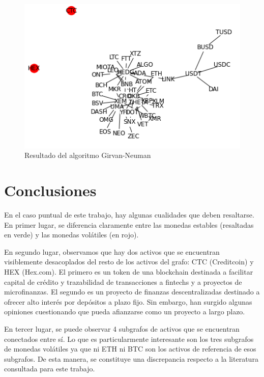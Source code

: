 \documentclass[runningheads,a4paper,10pt]{etc/llncs}
\let\stdsection\section
\renewcommand\section{\newpage\stdsection}
\begin{document}
\begin{figure}[htp]
    \centering
    \includegraphics[scale=1]{images/community_gn.png}
    \caption{Resultado del algoritmo Girvan-Neuman}
    \label{fig:community_gn}
\end{figure}

\section{Conclusiones}

En el caso puntual de este trabajo, hay algunas cualidades que deben resaltarse. En primer lugar, se diferencia claramente entre las monedas estables (resaltadas en verde) y las monedas volátiles (en rojo). 

En segundo lugar, observamos que hay dos activos que se encuentran visiblemente desacoplados del resto de los activos del grafo: CTC (Creditcoin) y HEX (Hex.com). El primero es un token de una blockchain destinada a facilitar capital de crédito y trazabilidad de transacciones a fintechs y a proyectos de microfinanzas. El segundo es un proyecto de finanzas descentralizadas destinado a ofrecer alto interés por depósitos a plazo fijo. Sin embargo, han surgido algunas opiniones cuestionando que pueda afianzarse como un proyecto a largo plazo.

En tercer lugar, se puede observar 4 subgrafos de activos que se encuentran conectados entre sí. Lo que es particularmente interesante son los tres subgrafos de monedas volátiles ya que ni ETH ni BTC son los activos de referencia de esos subgrafos. De esta manera, se constituye una discrepancia respecto a la literatura consultada para este trabajo.


\printbibliography %
\end{document}
